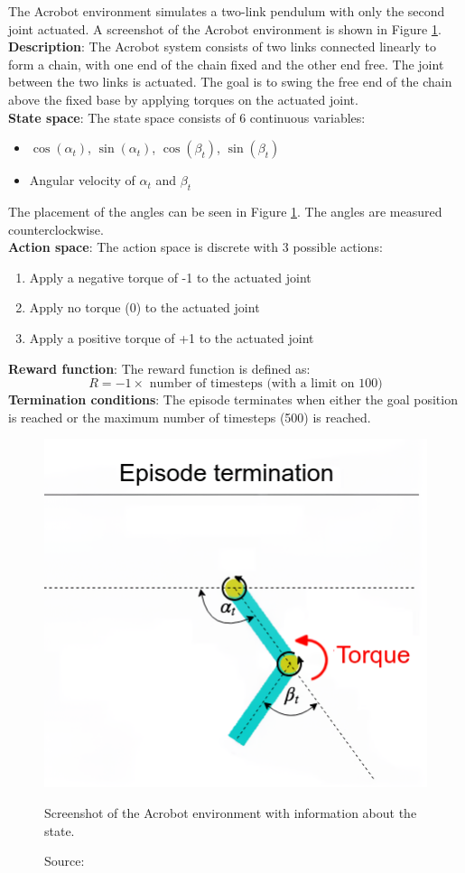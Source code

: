 The Acrobot environment \cite{acrobotfarama} simulates a two-link
pendulum with only the second joint actuated. A screenshot of the
Acrobot environment is shown in Figure \ref{fig:acrobot}.\\
\textbf{Description}: The Acrobot system consists of two links
connected linearly to form a chain, with one end of the chain fixed
and the other end free. The joint between the two links is actuated.
The goal is to swing the free end of the chain above the fixed base
by applying torques on the actuated joint.\\
\textbf{State space}: The state space consists of 6 continuous variables:
\begin{itemize}
    \item $\cos(\alpha_t)$, $\sin(\alpha_t)$, $\cos(\beta_t)$, $\sin(\beta_t)$
    \item Angular velocity of $\alpha_t$ and $\beta_t$
\end{itemize}
The placement of the angles can be seen in Figure \ref{fig:acrobot}.
The angles are measured counterclockwise.\\
\textbf{Action space}: The action space is discrete with 3 possible actions:
\begin{enumerate}
    \item Apply a negative torque of -1 to the actuated joint
    \item Apply no torque (0) to the actuated joint
    \item Apply a positive torque of +1 to the actuated joint
\end{enumerate}
\textbf{Reward function}: The reward function is defined as:
\begin{equation}
    R = -1 \times \text{ number of timesteps (with a limit on 100)}
\end{equation}
\textbf{Termination conditions}: The episode terminates when either
the goal position is reached or the maximum number
of timesteps (500) is reached.

\begin{figure}[h]
    \centering
    \includegraphics[width=.45\textwidth]{figures/ch4/acrobotpic.png}
    \caption{Screenshot of the Acrobot environment with information about the state.}
    \vspace{-10px}
    \caption*{\scriptsize{Source: \cite{acrobotpic}}}
    \label{fig:acrobot}
\end{figure}


